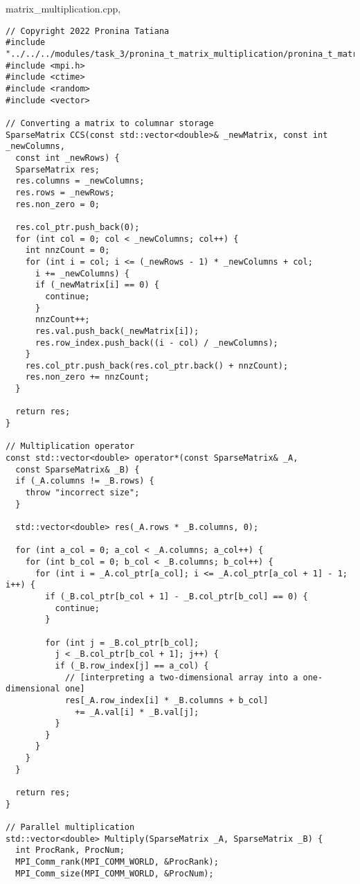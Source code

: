 \documentclass[12pt,a4paper]{article}
\begin{document}
\section{} matrix\_multiplication.cpp,
\begin{lstlisting}
// Copyright 2022 Pronina Tatiana
#include "../../../modules/task_3/pronina_t_matrix_multiplication/pronina_t_matrix_multiplication.h"
#include <mpi.h>
#include <ctime>
#include <random>
#include <vector>

// Converting a matrix to columnar storage
SparseMatrix CCS(const std::vector<double>& _newMatrix, const int _newColumns,
  const int _newRows) {
  SparseMatrix res;
  res.columns = _newColumns;
  res.rows = _newRows;
  res.non_zero = 0;

  res.col_ptr.push_back(0);
  for (int col = 0; col < _newColumns; col++) {
    int nnzCount = 0;
    for (int i = col; i <= (_newRows - 1) * _newColumns + col;
      i += _newColumns) {
      if (_newMatrix[i] == 0) {
        continue;
      }
      nnzCount++;
      res.val.push_back(_newMatrix[i]);
      res.row_index.push_back((i - col) / _newColumns);
    }
    res.col_ptr.push_back(res.col_ptr.back() + nnzCount);
    res.non_zero += nnzCount;
  }

  return res;
}

// Multiplication operator
const std::vector<double> operator*(const SparseMatrix& _A,
  const SparseMatrix& _B) {
  if (_A.columns != _B.rows) {
    throw "incorrect size";
  }

  std::vector<double> res(_A.rows * _B.columns, 0);

  for (int a_col = 0; a_col < _A.columns; a_col++) {
    for (int b_col = 0; b_col < _B.columns; b_col++) {
      for (int i = _A.col_ptr[a_col]; i <= _A.col_ptr[a_col + 1] - 1; i++) {
        if (_B.col_ptr[b_col + 1] - _B.col_ptr[b_col] == 0) {
          continue;
        }

        for (int j = _B.col_ptr[b_col];
          j < _B.col_ptr[b_col + 1]; j++) {
          if (_B.row_index[j] == a_col) {
            // [interpreting a two-dimensional array into a one-dimensional one]
            res[_A.row_index[i] * _B.columns + b_col]
              += _A.val[i] * _B.val[j];
          }
        }
      }
    }
  }

  return res;
}

// Parallel multiplication
std::vector<double> Multiply(SparseMatrix _A, SparseMatrix _B) {
  int ProcRank, ProcNum;
  MPI_Comm_rank(MPI_COMM_WORLD, &ProcRank);
  MPI_Comm_size(MPI_COMM_WORLD, &ProcNum);


\end{lstlisting}
\end{document}
